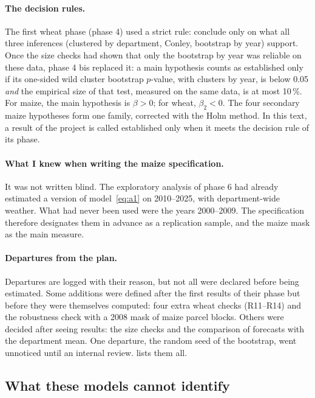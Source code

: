 \paragraph{The decision rules.} The first wheat phase (phase 4) used a strict rule: conclude only on what all three inferences (clustered by department, Conley, bootstrap by year) support. Once the size checks had shown that only the bootstrap by year was reliable on these data, phase 4 bis replaced it: a main hypothesis counts as established only if its one-sided wild cluster bootstrap $p$-value, with clusters by year, is below 0.05 \emph{and} the empirical size of that test, measured on the same data, is at most 10\,\%. For maize, the main hypothesis is $\beta > 0$; for wheat, $\beta_2 < 0$. The four secondary maize hypotheses form one family, corrected with the Holm method. In this text, a result of the project is called established only when it meets the decision rule of its phase.

\paragraph{What I knew when writing the maize specification.} It was not written blind. The exploratory analysis of phase 6 had already estimated a version of model~\eqref{eq:a1} on 2010--2025, with department-wide weather. What had never been used were the years 2000--2009. The specification therefore designates them in advance as a replication sample, and the maize mask as the main measure.

\paragraph{Departures from the plan.} Departures are logged with their reason, but not all were declared before being estimated. Some additions were defined after the first results of their phase but before they were themselves computed: four extra wheat checks (R11--R14) and the robustness check with a 2008 mask of maize parcel blocks. Others were decided after seeing results: the size checks and the comparison of forecasts with the department mean. One departure, the random seed of the bootstrap, went unnoticed until an internal review.  lists them all.

\subsection{What these models cannot identify}
\label{subsec:not-identified}

